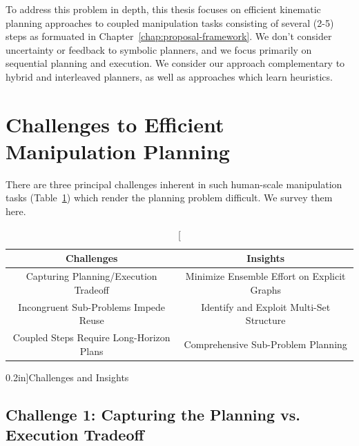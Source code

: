 To address this problem in depth,
this thesis focuses on
efficient kinematic planning approaches
to coupled manipulation tasks consisting of several (2-5) steps
as formuated in Chapter~\ref{chap:proposal-framework}.
We don't consider uncertainty
or feedback to symbolic planners,
and we focus primarily on sequential planning and execution.
We consider our approach complementary to
hybrid and interleaved planners,
as well as approaches which learn heuristics.

\section*{Challenges to Efficient Manipulation Planning}

There are three principal challenges inherent in such
human-scale manipulation tasks (Table~\ref{tab:challenges-insights})
which render the planning problem difficult.
We survey them here.

\begin{table}[t]
   \centering
   \begin{tabular}{cc}
      \toprule
      Challenges & Insights \\
      \midrule
      Capturing Planning/Execution Tradeoff
         & Minimize Ensemble Effort on Explicit Graphs \\
      Incongruent Sub-Problems Impede Reuse
         & Identify and Exploit Multi-Set Structure \\
      Coupled Steps Require Long-Horizon Plans
         & Comprehensive Sub-Problem Planning \\
      \bottomrule
   \end{tabular}
   \caption[][0.2in]{Challenges and Insights}
   \label{tab:challenges-insights}
\end{table}

\subsection*{Challenge 1:
   Capturing the Planning vs. Execution Tradeoff}


